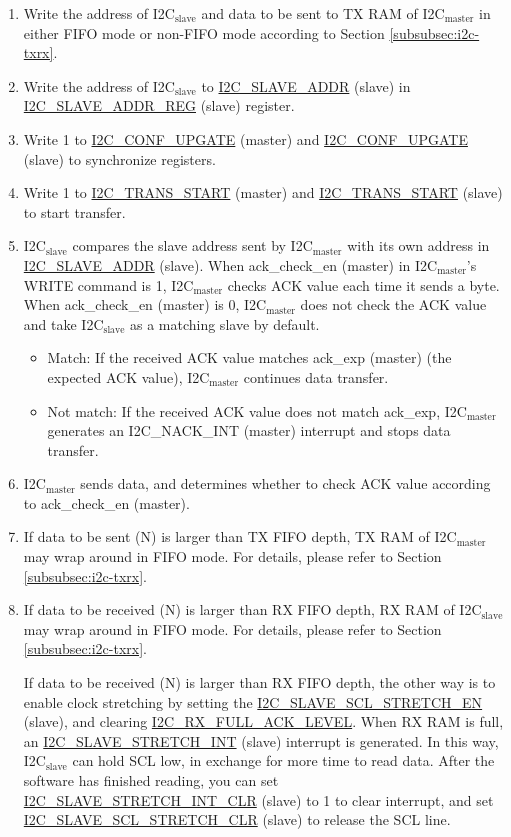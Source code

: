 \documentclass[main\_\_EN.tex]{subfiles}
\begin{document}
\begin{enumerate}
\item Write the address of I2C$_\text{slave}$ and data to be sent to TX RAM of I2C$_\text{master}$ in either FIFO mode or non-FIFO mode according to Section \ref{subsubsec:i2c-txrx}.
\item Write the address of I2C$_\text{slave}$ to \hyperref[fielddesc:I2CSLAVEADDR]{I2C\_SLAVE\_ADDR} (slave) in \hyperref[regdesc:I2CSLAVEADDRREG]{I2C\_SLAVE\_ADDR\_REG} (slave) register.
\item Write 1 to \hyperref[fielddesc:I2CCONFUPGATE]{I2C\_CONF\_UPGATE} (master) and \hyperref[fielddesc:I2CCONFUPGATE]{I2C\_CONF\_UPGATE} (slave) to synchronize registers.
\item Write 1 to \hyperref[fielddesc:I2CTRANSSTART]{I2C\_TRANS\_START} (master) and \hyperref[fielddesc:I2CTRANSSTART]{I2C\_TRANS\_START} (slave) to start transfer.
\item I2C$_\text{slave}$ compares the slave address sent by I2C$_\text{master}$ with its own address in \hyperref[fielddesc:I2CSLAVEADDR]{I2C\_SLAVE\_ADDR} (slave). When ack\_check\_en (master) in I2C$_\text{master}$'s WRITE command is 1, I2C$_\text{master}$ checks ACK value each time it sends a byte. When ack\_check\_en (master) is 0, I2C$_\text{master}$ does not check the ACK value and take I2C$_\text{slave}$ as a matching slave by default.
\begin{itemize}
\item Match: If the received ACK value matches ack\_exp (master) (the expected ACK value), I2C$_\text{master}$ continues data transfer.
\item Not match: If the received ACK value does not match ack\_exp, I2C$_\text{master}$ generates an I2C\_NACK\_INT (master) interrupt and stops data transfer.
\end{itemize}

\item I2C$_\text{master}$ sends data, and determines whether to check ACK value according to ack\_check\_en (master).
\item If data to be sent (N) is larger than TX FIFO depth, TX RAM of I2C$_\text{master}$ may wrap around in FIFO mode. For details, please refer to Section \ref{subsubsec:i2c-txrx}.
\item If data to be received (N) is larger than RX FIFO depth, RX RAM of I2C$_\text{slave}$ may wrap around in FIFO mode. For details, please refer to Section \ref{subsubsec:i2c-txrx}.

If data to be received (N) is larger than RX FIFO depth, the other way is to enable clock stretching by setting the \hyperref[fielddesc:I2CSLAVESCLSTRETCHEN]{I2C\_SLAVE\_SCL\_STRETCH\_EN} (slave), and clearing \hyperref[fielddesc:I2CRXFULLACKLEVEL]{I2C\_RX\_FULL\_ACK\_LEVEL}. When RX RAM is full, an \hyperref[int:i2c-slave-stretch]{I2C\_SLAVE\_STRETCH\_INT} (slave) interrupt is generated. In this way, I2C$_\text{slave}$ can hold SCL low, in exchange for more time to read data. After the software has finished reading, you can set \hyperref[fielddesc:I2CSLAVESTRETCHINTCLR]{I2C\_SLAVE\_STRETCH\_INT\_CLR} (slave) to 1 to clear interrupt, and set \hyperref[fielddesc:I2CSLAVESCLSTRETCHCLR]{I2C\_SLAVE\_SCL\_STRETCH\_CLR} (slave) to release the SCL line.


\end{enumerate}
\end{document}
